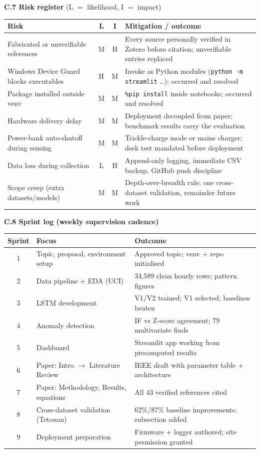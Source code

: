 \documentclass[11pt,a4paper]{article}
\begin{document}
\noindent\textbf{C.7 Risk register} (L $=$ likelihood, I $=$ impact)\par\smallskip
\begin{tabular}{|p{5.4cm}|c|c|p{6.6cm}|}
\hline
\textbf{Risk} & \textbf{L} & \textbf{I} & \textbf{Mitigation / outcome}\\ \hline
Fabricated or unverifiable references & M & H & Every source personally verified in Zotero before citation; unverifiable entries replaced\\ \hline
Windows Device Guard blocks executables & H & M & Invoke as Python modules (\texttt{python -m streamlit} \dots); occurred and resolved\\ \hline
Package installed outside venv & M & M & \texttt{\%pip install} inside notebooks; occurred and resolved\\ \hline
Hardware delivery delay & M & M & Deployment decoupled from paper; benchmark results carry the evaluation\\ \hline
Power-bank auto-shutoff during sensing & M & M & Trickle-charge mode or mains charger; desk test mandated before deployment\\ \hline
Data loss during collection & L & H & Append-only logging, immediate CSV backup, GitHub push discipline\\ \hline
Scope creep (extra datasets/models) & M & M & Depth-over-breadth rule: one cross-dataset validation, remainder future work\\ \hline
\end{tabular}
\bigskip

\noindent\textbf{C.8 Sprint log (weekly supervision cadence)}\par\smallskip
\begin{tabular}{|c|p{6.2cm}|p{6.6cm}|}
\hline
\textbf{Sprint} & \textbf{Focus} & \textbf{Outcome}\\ \hline
1 & Topic, proposal, environment setup & Approved topic; venv $+$ repo initialised\\ \hline
2 & Data pipeline $+$ EDA (UCI) & 34{,}589 clean hourly rows; pattern figures\\ \hline
3 & LSTM development & V1/V2 trained; V1 selected; baselines beaten\\ \hline
4 & Anomaly detection & IF vs Z-score agreement; 79 multivariate finds\\ \hline
5 & Dashboard & Streamlit app working from precomputed results\\ \hline
6 & Paper: Intro $\to$ Literature Review & IEEE draft with parameter table $+$ architecture\\ \hline
7 & Paper: Methodology, Results, equations & All 43 verified references cited\\ \hline
8 & Cross-dataset validation (Tetouan) & 62\%/87\% baseline improvements; subsection added\\ \hline
9 & Deployment preparation & Firmware $+$ logger authored; site permission granted\\ \hline
\end{tabular}
\bigskip
\end{document}
